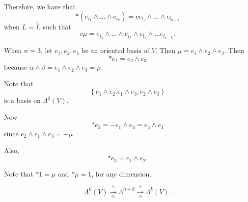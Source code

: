 \documentclass[notoc,notitlepage]{tufte-book}
\begin{document}
Therefore, we have that
\begin{equation*}
  *(e_{i_1} \land \hdots \land e_{i_k}) = c e_{l_1} \land \hdots \land
  e_{l_{n-k}}
\end{equation*}
when $L = \hat{I}$, such that
\begin{equation*}\label{eq:}
  c \mu = e_{i_1} \land \hdots \land e_{i_k} \land e_{l_1} \land \hdots
  e_{l_{n-k}}.
\end{equation*}

\begin{eg}
  When $n = 3$, let $e_1, e_2, e_3$ be an oriented basis of $V$. Then $\mu = e_1
  \land e_2 \land e_3$. Then
  \begin{equation*}
    * e_1 = e_2 \land e_3
  \end{equation*}
  because $\alpha \land \beta = e_1 \land e_2 \land e_3 = \mu$.

  Note that
  \begin{equation*}
    \left\{ e_1 \land e_2. e_1 \land e_3, e_2 \land e_3 \right\}
  \end{equation*}
  is a basis on $\Lambda^2(V)$.

  Now
  \begin{equation*}
    * e_2 = - e_1 \land e_3 = e_3 \land e_1
  \end{equation*}
  since $e_2 \land e_1 \land e_3 = - \mu$

  Also,
  \begin{equation*}
    * e_3 = e_1 \land e_2.
  \end{equation*}

  Note that $* 1 = \mu$ and  $* \mu = 1$, for any dimension.
\end{eg}

\begin{equation*}
  \Lambda^k(V) \overset{*}{\underset{\cong}{\to}} \Lambda^{n-k}
  \overset{*}{\underset{\cong}{\to}} \Lambda^k(V).
\end{equation*}

\noindent
{} 
\end{document}

